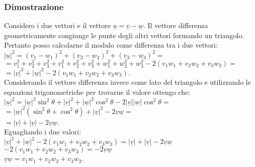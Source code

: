 \subsubsection{Dimostrazione}
Considero i due vettori e il vettore $\underline{u}=\underline{v}-\underline{w}$. Il vettore differenza geometricamente congiunge le punte degli altri vettori formando un
triangolo. Pertanto posso calcolarne il modulo come differenza tra i due vettori:\\
$|\underline{u}|^2=(v_1-w_1)^2+(v_2-w_2)^2+(v_3-w_3)^2=$\\
$=v_1^2+v_2^2+v_3^2+v_1^2+v_2^2+v_3^2+w_1^2+w_2^2+w_3^2-2(v_1w_1+v_2w_2+v_3w_3)=$\\
$=|\underline{v}|^2+|\underline{w}|^2-2(v_1w_1+v_2w_2+v_3w_3)$.\\
Considerando il vettore differenza invece come lato del triangolo e utilizzando le equazioni trigonometriche per trovarne il valore ottengo che:\\
$| \underline{u}|^{2}=| \underline{w}|^{2}\sin^{2}\theta+|\underline{v}|^2+|\underline{w}|^2\cos^2\theta-2|\underline{v}||\underline{w}|\cos^2\theta=$\\
$=| \underline{w}|^2(\sin^2\theta+\cos^2\theta)+|\underline{v}|^2-2\underline{v}\underline{w}=$\\
$=|\underline{v}|+|\underline{v}|-2\underline{v}\underline{w}$.\\
Eguagliando i due valori:\\
$|\underline{v}|^2+|\underline{w}|^2-2(v_1w_1+v_2w_2+v_3w_3)=|\underline{v}|+|\underline{v}|-2\underline{v}\underline{w}$\\
$-2(v_1w_1+v_2w_2+v_3w_3)=-2\underline{v}\underline{w}$\\
$\underline{v}\underline{w}=v_1w_1+v_2w_2+v_3w_3$.